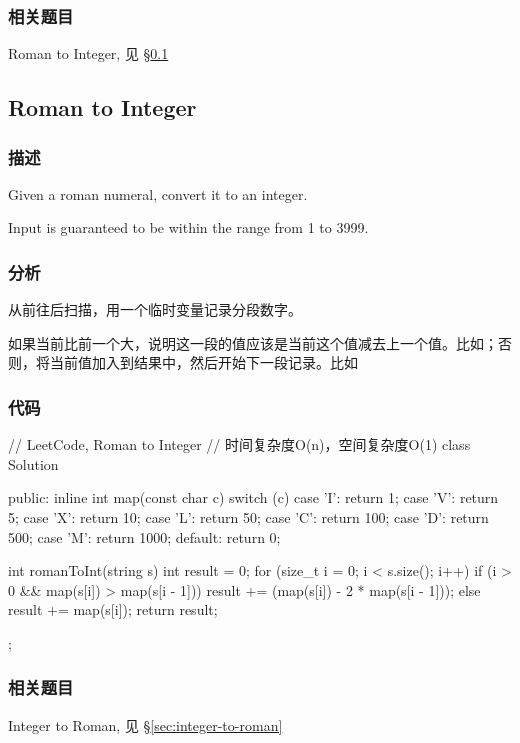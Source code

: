 \subsubsection{相关题目}
\begindot
\item Roman to Integer, 见 \S \ref{sec:roman-to-integer}
\myenddot


\subsection{Roman to Integer} %
\label{sec:roman-to-integer}


\subsubsection{描述}
Given a roman numeral, convert it to an integer.

Input is guaranteed to be within the range from 1 to 3999.


\subsubsection{分析}
从前往后扫描，用一个临时变量记录分段数字。

如果当前比前一个大，说明这一段的值应该是当前这个值减去上一个值。比如；否则，将当前值加入到结果中，然后开始下一段记录。比如


\subsubsection{代码}
\begin{Code}
	// LeetCode, Roman to Integer
	// 时间复杂度O(n)，空间复杂度O(1)
	class Solution {
		public:
		inline int map(const char c) {
			switch (c) {
				case 'I': return 1;
				case 'V': return 5;
				case 'X': return 10;
				case 'L': return 50;
				case 'C': return 100;
				case 'D': return 500;
				case 'M': return 1000;
				default: return 0;
			}
		}
		
		int romanToInt(string s) {
			int result = 0;
			for (size_t i = 0; i < s.size(); i++) {
				if (i > 0 && map(s[i]) > map(s[i - 1])) {
					result += (map(s[i]) - 2 * map(s[i - 1]));
				} else {
				result += map(s[i]);
			}
		}
		return result;
	}
};
\end{Code}


\subsubsection{相关题目}
\begindot
\item Integer to Roman, 见 \S \ref{sec:integer-to-roman}
\myenddot


